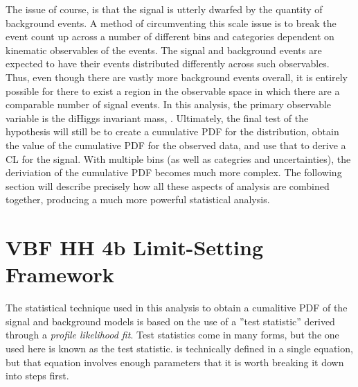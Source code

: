     The issue of course, is that the signal is utterly dwarfed by the quantity of background events.
    A method of circumventing this scale issue
        is to break the event count up across a number of different
        bins and categories dependent on kinematic observables of the events.
    The signal and background events are expected to have their events distributed differently across such observables.
    Thus, even though there are vastly more background events overall,
        it is entirely possible for there to exist a region in the observable space
        in which there are a comparable number of signal events.
    In this analysis, the primary observable variable is the diHiggs invariant mass, \mhh.
    Ultimately, the final test of the hypothesis will still be to create a cumulative PDF for the distribution,
        obtain the value of the cumulative PDF for the observed data, and use that to derive a CL for the signal.
    With multiple bins (as well as categries and uncertainties), the deriviation of the cumulative PDF becomes much more complex.
    The following section will describe precisely how all these aspects of analysis are combined together,
        producing a much more powerful statistical analysis.



\FloatBarrier
\section{VBF  HH  4b Limit-Setting Framework}
    
    The statistical technique used in this analysis to obtain a cumalitive PDF of the signal and background models
        is based on the use of a ''test statistic'' derived through a \textit{profile likelihood fit}.
    Test statistics come in many forms, but the one used here is known as the \qtil test statistic.
    \qtil is technically defined in a single equation,
        but that equation involves enough parameters that it is worth breaking it down into steps first.

